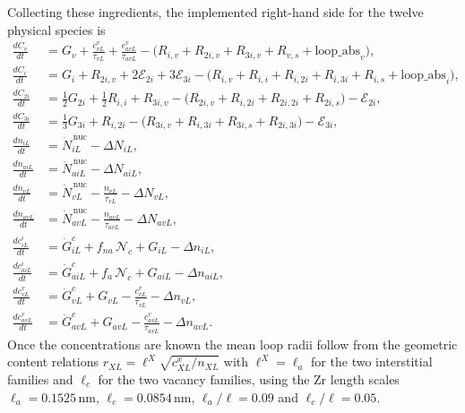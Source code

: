 \documentclass{article}
\begin{document}
Collecting these ingredients, the implemented right-hand side for the twelve
physical species is
\begin{align}
\frac{dC_v}{dt} &= G_v+\frac{c_{vL}^{v}}{\tau_{vL}}+\frac{c_{avL}^{v}}{\tau_{avL}}
   -\bigl(R_{i,v}+R_{2i,v}+R_{3i,v}+R_{v,s}+\text{loop\_abs}_v\bigr),\\
\frac{dC_i}{dt} &= G_i+R_{2i,v}+2\mathcal{E}_{2i}+3\mathcal{E}_{3i}
   -\bigl(R_{i,v}+R_{i,i}+R_{i,2i}+R_{i,3i}+R_{i,s}+\text{loop\_abs}_i\bigr),\\
\frac{dC_{2i}}{dt} &= \tfrac{1}{2}G_{2i}+\tfrac{1}{2}R_{i,i}+R_{3i,v}
   -\bigl(R_{2i,v}+R_{i,2i}+R_{2i,2i}+R_{2i,s}\bigr)-\mathcal{E}_{2i},\\
\frac{dC_{3i}}{dt} &= \tfrac{1}{3}G_{3i}+R_{i,2i}
   -\bigl(R_{3i,v}+R_{i,3i}+R_{3i,s}+R_{2i,3i}\bigr)-\mathcal{E}_{3i},\\
\frac{dn_{iL}}{dt} &= \dot N_{iL}^{\,\mathrm{nuc}}-\Delta N_{iL},\\
\frac{dn_{aiL}}{dt} &= \dot N_{aiL}^{\,\mathrm{nuc}}-\Delta N_{aiL},\\
\frac{dn_{vL}}{dt} &= \dot N_{vL}^{\,\mathrm{nuc}}-\frac{n_{vL}}{\tau_{vL}}-\Delta N_{vL},\\
\frac{dn_{avL}}{dt} &= \dot N_{avL}^{\,\mathrm{nuc}}-\frac{n_{avL}}{\tau_{avL}}-\Delta N_{avL},\\
\frac{dc_{iL}^{i}}{dt} &= \dot{G}_{iL}^{c}+f_{na}\,\mathcal{N}_c+G_{iL}-\Delta n_{iL},\\
\frac{dc_{aiL}^{i}}{dt} &= \dot{G}_{aiL}^{c}+f_{a}\,\mathcal{N}_c+G_{aiL}-\Delta n_{aiL},\\
\frac{dc_{vL}^{v}}{dt} &= \dot{G}_{vL}^{c}+G_{vL}-\frac{c_{vL}^{v}}{\tau_{vL}}-\Delta n_{vL},\\
\frac{dc_{avL}^{v}}{dt} &= \dot{G}_{avL}^{c}+G_{avL}-\frac{c_{avL}^{v}}{\tau_{avL}}-\Delta n_{avL}.
\end{align}
Once the concentrations are known the mean loop radii follow from the geometric
content relations $r_{XL}=\ell^{X}\sqrt{c^x_{XL}/n_{XL}}$ with $\ell^{X}=\ell_a$
for the two interstitial families and $\ell_c$ for the two vacancy families, using
the Zr length scales $\ell_a=0.1525\,$nm, $\ell_c=0.0854\,$nm, $\ell_a/\ell=0.09$
and $\ell_c/\ell=0.05$.
\end{document}
